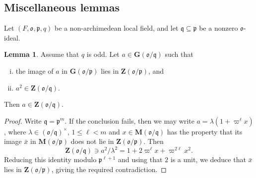 \documentclass[reqno]{amsart}
\theoremstyle{plain} \newtheorem{theorem} {Theorem} \newtheorem{conjecture} {Conjecture} \newtheorem{corollary} [theorem] {Corollary} \newtheorem{proposition} [theorem] {Proposition} \newtheorem{fact} [theorem] {Fact}
\theoremstyle{definition} \newtheorem{definition} [theorem] {Definition}
\theoremstyle{itplain} %
\newtheorem{lemma}[theorem]{Lemma}
\newcommand{\mfq}{\mathfrak{q}}
\begin{document}
\subsection{Miscellaneous lemmas}
Let $(F,\mathfrak{o},\mathfrak{p},q)$ be a non-archimedean local field, and let $\mfq \subseteq \mathfrak{p}$ be a nonzero $\mathfrak{o}$-ideal.

\begin{lemma}\label{lemma:supp-char-mathfr-odd.-let-a-in-mathbfgm}
  Assume that $q$ is odd.  Let $a \in \mathbf{G}(\mathfrak{o}/\mfq)$ such that
  \begin{enumerate}[(i)]
  \item the image of $a$ in $\mathbf{G}(\mathfrak{o}/\mathfrak{p})$ lies in $\mathbf{Z}(\mathfrak{o}/\mathfrak{p})$, and
  \item $a^2 \in \mathbf{Z}(\mathfrak{o}/\mfq)$.
  \end{enumerate}
  Then $a \in \mathbf{Z}(\mathfrak{o}/\mfq)$.
\end{lemma}
\begin{proof}
  Write $\mfq = \mathfrak{p}^m$.  If the conclusion fails, then we may write $a = \lambda (1 + \varpi^{\ell} x)$, where $\lambda \in {(\mathfrak{o}/\mfq)}^\times$, $1 \leq \ell < m$ and $x \in \mathbf{M}(\mathfrak{o}/\mfq)$ has the property that its image $\bar{x}$ in $\mathbf{M}(\mathfrak{o}/\mathfrak{p})$ does not lie in $\mathbf{Z}(\mathfrak{o}/\mathfrak{p})$.  Then
  \begin{equation*}
    \mathbf{Z}(\mathfrak{o}/\mfq) \ni a^2 / \lambda^2 = 1 + 2 \varpi^{\ell} x + \varpi^{2 \ell} x^2.
  \end{equation*}
  Reducing this identity modulo $\mathfrak{p}^{\ell+1}$ and using that $2$ is a unit, we deduce that $\bar{x}$ lies in $\mathbf{Z}(\mathfrak{o}/\mathfrak{p})$, giving the required contradiction.
\end{proof}
\end{document}

